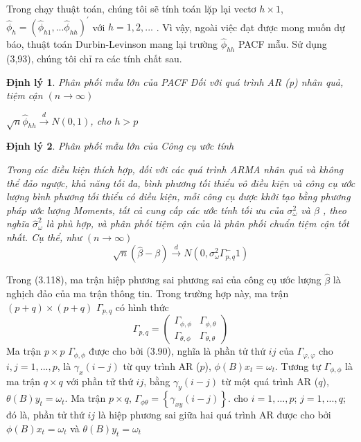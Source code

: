 \documentclass[12pt, a4paper,oneside]{book}
\newtheorem{theo}{\bf Định lý}[section]
\theoremstyle{definition}
\begin{document}
Trong chạy thuật toán, chúng tôi sẽ tính toán lặp lại vectơ $ h \times 1 $, $\hat{\phi}_{h}=(\hat{\phi}_{h1},...\hat{\phi}_{hh})^{\prime}  $ với $ h = 1, 2 ,... $ . Vì vậy, ngoài việc đạt được mong muốn dự báo, thuật toán Durbin-Levinson mang lại trường $ \hat{\phi}_{hh} $ PACF mẫu. Sử dụng (3,93), chúng tôi chỉ ra các tính chất sau.
\begin{theo}
	Phân phối mẫu lớn của PACF
	Đối với quá trình AR (p) nhân quả, tiệm cận $ (n \longrightarrow\infty) $
	\begin{center}
		$\sqrt{n}\hat{\phi}_{hh} \xrightarrow{d} N(0,1)$, cho $h>p  $
	\end{center}
	
\end{theo}
\begin{theo}
	Phân phối mẫu lớn của Công cụ ước tính
	
	Trong các điều kiện thích hợp, đối với các quá trình ARMA nhân quả và không thể đảo ngược, khả năng tối đa, bình phương tối thiểu vô điều kiện và công cụ ước lượng bình phương tối thiểu có điều kiện, mỗi công cụ được khởi tạo bằng phương pháp ước lượng Moments, tất cả cung cấp các ước tính tối ưu của $ \sigma_{\omega}^2 $ và  $ \beta $  , theo nghĩa $ \hat{\sigma}_{\omega}^2 $   là phù hợp, và phân phối tiệm cận của là phân phối chuẩn tiệm cận tốt nhất. Cụ thể, như $ (n \longrightarrow\infty) $
	$$\sqrt{n}(\hat{\beta}-\beta) \xrightarrow{d} N(0,\sigma_{\omega}^2\Gamma_{p,q}^-1)$$
	
\end{theo}
Trong (3.118), ma trận hiệp phương sai phương sai của công cụ ước lượng $ \hat{\beta} $ là nghịch đảo của ma trận thông tin. Trong trường hợp này, ma trận $ (p + q) \times (p + q) $ $ \Gamma_{p,q} $ có hình thức
$$ \Gamma_{p,q}= \begin{pmatrix}
\Gamma_{\phi,\phi}  & \Gamma_{\phi,\theta} \\
\Gamma_{\theta,\phi}  & \Gamma_{\theta,\theta}
\end{pmatrix} $$
Ma trận $ p \times p $  $ \Gamma_{\phi,\phi}  $
được cho bởi (3.90), nghĩa là phần tử thứ $ ij $ của $ \Gamma_{\varphi,\varphi}  $ cho
$ i, j = 1 ,. . . , p $, là $ \gamma_{x}(i-j) $ từ quy trình AR ($ p $), $ \phi (B)x_{t}=\omega_{t} $. Tương tự $ \Gamma_{\phi,\phi} $ là ma trận $ q \times q $ với phần tử thứ $ ij $, bằng $ \gamma_{y}(i-j) $ từ một quá trình AR ($ q $), $ \theta(B)y_{t}=\omega_{t} $. Ma trận $ p \times q $, $ \Gamma_{\phi\theta} = \left\lbrace \gamma_{xy}(i-j)\right\rbrace  $. cho $ i = 1 ,. . . , p $; $ j = 1 ,. . . , q $; đó là, phần tử thứ $ ij $ là hiệp phương sai giữa hai quá trình AR được cho bởi $ \phi (B)x_{t}=\omega_{t} $ và $ \theta(B)y_{t}=\omega_{t} $ 
\end{document}
